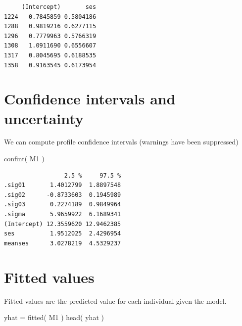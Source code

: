 \documentclass[
  letterpaper,
  DIV=11,
  numbers=noendperiod]{scrreprt}
\newenvironment{Shaded}{\begin{snugshade}}{\end{snugshade}}
\newcommand{\FunctionTok}[1]{\textcolor[rgb]{0.02,0.16,0.49}{#1}}
\newcommand{\NormalTok}[1]{\textcolor[rgb]{0.00,0.44,0.13}{#1}}
\newcommand{\OtherTok}[1]{\textcolor[rgb]{0.00,0.44,0.13}{#1}}
\newcommand{\SpecialCharTok}[1]{\textcolor[rgb]{0.25,0.44,0.63}{#1}}
\begin{document}
\begin{Shaded}
\end{Shaded}

\begin{verbatim}
     (Intercept)       ses
1224   0.7845859 0.5804186
1288   0.9819216 0.6277115
1296   0.7779963 0.5766319
1308   1.0911690 0.6556607
1317   0.8045695 0.6188535
1358   0.9163545 0.6173954
\end{verbatim}

\hypertarget{confidence-intervals-and-uncertainty}{%
\section{Confidence intervals and
uncertainty}\label{confidence-intervals-and-uncertainty}}

We can compute profile confidence intervals (warnings have been
suppressed)

\begin{Shaded}
\begin{Highlighting}[]
\FunctionTok{confint}\NormalTok{( M1 )}
\end{Highlighting}
\end{Shaded}

\begin{verbatim}
                 2.5 %     97.5 %
.sig01       1.4012799  1.8897548
.sig02      -0.8733603  0.1945989
.sig03       0.2274189  0.9849964
.sigma       5.9659922  6.1689341
(Intercept) 12.3559620 12.9462385
ses          1.9512025  2.4296954
meanses      3.0278219  4.5329237
\end{verbatim}

\hypertarget{fitted-values-1}{%
\section{Fitted values}\label{fitted-values-1}}

Fitted values are the predicted value for each individual given the
model.

\begin{Shaded}
\begin{Highlighting}[]
\NormalTok{yhat }\OtherTok{=} \FunctionTok{fitted}\NormalTok{( M1 )}
\FunctionTok{head}\NormalTok{( yhat )}
\end{Highlighting}
\end{Shaded}
\end{document}
